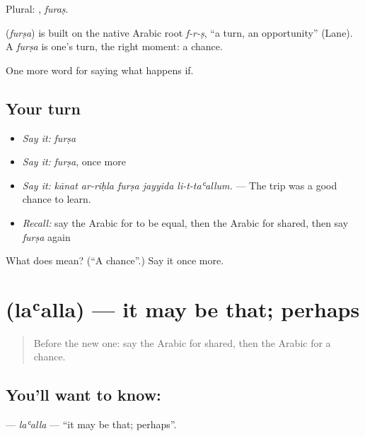 Plural: , \emph{furaṣ}.

\begin{cousinweb}
\textbf{} (\emph{furṣa}) is built on the native Arabic root \emph{f-r-ṣ}, \textquotedblleft{}a turn, an opportunity\textquotedblright{} (Lane). A \emph{furṣa} is one's turn, the right moment: a chance.
\end{cousinweb}

\begin{grammarlens}[title={What you've built}]
One more word for saying what happens if.
\end{grammarlens}

\subsection*{Your turn}
\begin{itemize}
\raggedright
  \item \emph{Say it:} \emph{furṣa}
  \item \emph{Say it:} \emph{furṣa}, once more
  \item \emph{Say it:} \emph{kānat ar-riḥla furṣa jayyida li-t-taʿallum.} — The trip was a good chance to learn.
  \item \emph{Recall:} say the Arabic for to be equal, then the Arabic for shared, then say \emph{furṣa} again
\end{itemize}

\begin{tcolorbox}[breakable,colback=teal!4,colframe=teal!35!black,title={Before you move on}]
What does  mean? (\textquotedblleft{}A chance\textquotedblright{}.) Say it once more.
\end{tcolorbox}
\section[\texorpdfstring{\ar{لعل} (laʿalla)}{لعل (laʿalla)}]{ (laʿalla) — it may be that; perhaps}

\label{lesson:AR-C421-laalla}



\begin{quote}
Before the new one: say the Arabic for shared, then the Arabic for a chance.
\end{quote}

\subsection*{You'll want to know: }
\textbf{} — \emph{laʿalla} — \textquotedblleft{}it may be that; perhaps\textquotedblright{}.

